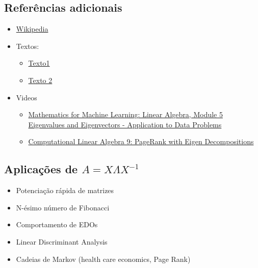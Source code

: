 \documentclass[
  letterpaper,
  DIV=11,
  numbers=noendperiod]{scrartcl}
\providecommand{\tightlist}{%
  \setlength{\itemsep}{0pt}\setlength{\parskip}{0pt}}\usepackage{longtable,booktabs,array}
\begin{document}
\hypertarget{referuxeancias-adicionais}{%
\subsection{Referências adicionais}\label{referuxeancias-adicionais}}

\begin{itemize}
\tightlist
\item
  \href{https://en.wikipedia.org/wiki/PageRank}{Wikipedia}
\item
  Textos:

  \begin{itemize}
  \tightlist
  \item
    \href{http://statweb.stanford.edu/~tibs/sta306bfiles/pagerank/ryan/01-24-pr.pdf}{Texto1}
  \item
    \href{https://web.stanford.edu/class/cs54n/handouts/24-GooglePageRankAlgorithm.pdf}{Texto
    2}
  \end{itemize}
\item
  Videos

  \begin{itemize}
  \item
    \href{https://youtu.be/F5fcEtqysGs}{Mathematics for Machine
    Learning: Linear Algebra, Module 5 Eigenvalues and Eigenvectors -
    Application to Data Problems}
  \item
    \href{https://youtu.be/AbB-w77yxD0}{Computational Linear Algebra 9:
    PageRank with Eigen Decompositions}
  \end{itemize}
\end{itemize}

\hypertarget{aplicauxe7uxf5es-de-a-xlambda-x-1}{%
\subsection{\texorpdfstring{Aplicações de
\(A = X\Lambda X^{-1}\)}{Aplicações de A = X\textbackslash Lambda X\^{}\{-1\}}}\label{aplicauxe7uxf5es-de-a-xlambda-x-1}}

\begin{itemize}
\tightlist
\item
  Potenciação rápida de matrizes
\item
  N-ésimo número de Fibonacci
\item
  Comportamento de EDOs
\item
  Linear Discriminant Analysis
\item
  Cadeias de Markov (health care economics, Page Rank)
\end{itemize}
\end{document}
